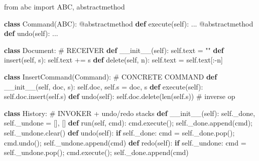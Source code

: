 \documentclass[11pt]{article}
\newenvironment{Shaded}{\begin{snugshade}}{\end{snugshade}}
\newcommand{\AttributeTok}[1]{\textcolor[rgb]{0.16,0.50,0.73}{#1}}
\newcommand{\BuiltInTok}[1]{\textcolor[rgb]{0.50,0.55,0.55}{#1}}
\newcommand{\CommentTok}[1]{\textcolor[rgb]{0.48,0.49,0.49}{#1}}
\newcommand{\ControlFlowTok}[1]{\textcolor[rgb]{0.99,0.74,0.29}{\textbf{#1}}}
\newcommand{\FunctionTok}[1]{\textcolor[rgb]{0.56,0.27,0.68}{#1}}
\newcommand{\ImportTok}[1]{\textcolor[rgb]{0.15,0.68,0.38}{#1}}
\newcommand{\KeywordTok}[1]{\textcolor[rgb]{0.81,0.81,0.76}{\textbf{#1}}}
\newcommand{\NormalTok}[1]{\textcolor[rgb]{0.81,0.81,0.76}{#1}}
\newcommand{\OperatorTok}[1]{\textcolor[rgb]{0.81,0.81,0.76}{#1}}
\newcommand{\StringTok}[1]{\textcolor[rgb]{0.96,0.31,0.31}{#1}}
\newcommand{\VariableTok}[1]{\textcolor[rgb]{0.15,0.68,0.68}{#1}}
\begin{document}
\begin{Shaded}
\begin{Highlighting}[]
\ImportTok{from}\NormalTok{ abc }\ImportTok{import}\NormalTok{ ABC, abstractmethod}

\KeywordTok{class}\NormalTok{ Command(ABC):}
    \AttributeTok{@abstractmethod}
    \KeywordTok{def}\NormalTok{ execute(}\VariableTok{self}\NormalTok{): ...}
    \AttributeTok{@abstractmethod}
    \KeywordTok{def}\NormalTok{ undo(}\VariableTok{self}\NormalTok{): ...}

\KeywordTok{class}\NormalTok{ Document:                                   }\CommentTok{\# RECEIVER}
    \KeywordTok{def} \FunctionTok{\_\_init\_\_}\NormalTok{(}\VariableTok{self}\NormalTok{): }\VariableTok{self}\NormalTok{.text }\OperatorTok{=} \StringTok{""}
    \KeywordTok{def}\NormalTok{ insert(}\VariableTok{self}\NormalTok{, s): }\VariableTok{self}\NormalTok{.text }\OperatorTok{+=}\NormalTok{ s}
    \KeywordTok{def}\NormalTok{ delete(}\VariableTok{self}\NormalTok{, n): }\VariableTok{self}\NormalTok{.text }\OperatorTok{=} \VariableTok{self}\NormalTok{.text[:}\OperatorTok{{-}}\NormalTok{n]}

\KeywordTok{class}\NormalTok{ InsertCommand(Command):                     }\CommentTok{\# CONCRETE COMMAND}
    \KeywordTok{def} \FunctionTok{\_\_init\_\_}\NormalTok{(}\VariableTok{self}\NormalTok{, doc, s): }\VariableTok{self}\NormalTok{.doc, }\VariableTok{self}\NormalTok{.s }\OperatorTok{=}\NormalTok{ doc, s}
    \KeywordTok{def}\NormalTok{ execute(}\VariableTok{self}\NormalTok{): }\VariableTok{self}\NormalTok{.doc.insert(}\VariableTok{self}\NormalTok{.s)}
    \KeywordTok{def}\NormalTok{ undo(}\VariableTok{self}\NormalTok{):    }\VariableTok{self}\NormalTok{.doc.delete(}\BuiltInTok{len}\NormalTok{(}\VariableTok{self}\NormalTok{.s))   }\CommentTok{\# inverse op}

\KeywordTok{class}\NormalTok{ History:                                    }\CommentTok{\# INVOKER + undo/redo stacks}
    \KeywordTok{def} \FunctionTok{\_\_init\_\_}\NormalTok{(}\VariableTok{self}\NormalTok{): }\VariableTok{self}\NormalTok{.\_done, }\VariableTok{self}\NormalTok{.\_undone }\OperatorTok{=}\NormalTok{ [], []}
    \KeywordTok{def}\NormalTok{ run(}\VariableTok{self}\NormalTok{, cmd):}
\NormalTok{        cmd.execute()}\OperatorTok{;} \VariableTok{self}\NormalTok{.\_done.append(cmd)}\OperatorTok{;} \VariableTok{self}\NormalTok{.\_undone.clear()}
    \KeywordTok{def}\NormalTok{ undo(}\VariableTok{self}\NormalTok{):}
        \ControlFlowTok{if} \VariableTok{self}\NormalTok{.\_done:}
\NormalTok{            cmd }\OperatorTok{=} \VariableTok{self}\NormalTok{.\_done.pop()}\OperatorTok{;}\NormalTok{ cmd.undo()}\OperatorTok{;} \VariableTok{self}\NormalTok{.\_undone.append(cmd)}
    \KeywordTok{def}\NormalTok{ redo(}\VariableTok{self}\NormalTok{):}
        \ControlFlowTok{if} \VariableTok{self}\NormalTok{.\_undone:}
\NormalTok{            cmd }\OperatorTok{=} \VariableTok{self}\NormalTok{.\_undone.pop()}\OperatorTok{;}\NormalTok{ cmd.execute()}\OperatorTok{;} \VariableTok{self}\NormalTok{.\_done.append(cmd)}


\end{Highlighting}
\end{Shaded}
\end{document}
